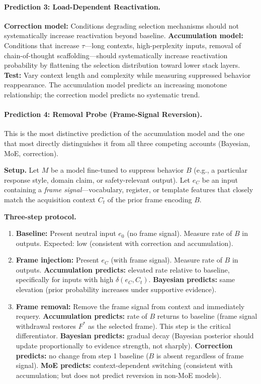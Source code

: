 \documentclass[12pt]{article}
\begin{document}
\paragraph{Prediction 3: Load-Dependent Reactivation.}
\textbf{Correction model:} Conditions degrading selection
mechanisms should not systematically increase reactivation
beyond baseline.
\textbf{Accumulation model:} Conditions that increase $\tau$---long
contexts, high-perplexity inputs, removal of chain-of-thought
scaffolding---should systematically increase reactivation probability
by flattening the selection distribution toward lower stack layers.
\textbf{Test:} Vary context length and complexity while measuring
suppressed behavior reappearance.
The accumulation model predicts an increasing monotone relationship;
the correction model predicts no systematic trend.

\paragraph{Prediction 4: Removal Probe (Frame-Signal Reversion).}
This is the most distinctive prediction of the accumulation model
and the one that most directly distinguishes it from all three
competing accounts (Bayesian, MoE, correction).

\textbf{Setup.}
Let $M$ be a model fine-tuned to suppress behavior $B$ (e.g.,
a particular response style, domain claim, or safety-relevant output).
Let $e_C$ be an input containing a \emph{frame signal}---vocabulary,
register, or template features that closely match the acquisition
context $C_t$ of the prior frame encoding $B$.

\textbf{Three-step protocol.}

\begin{enumerate}
  \item \textbf{Baseline:} Present neutral input $e_0$ (no frame
    signal). Measure rate of $B$ in outputs.
    Expected: low (consistent with correction and accumulation).

  \item \textbf{Frame injection:} Present $e_C$ (with frame signal).
    Measure rate of $B$ in outputs.
    \textbf{Accumulation predicts:} elevated rate relative to baseline,
    specifically for inputs with high $\delta(e_C, C_t)$.
    \textbf{Bayesian predicts:} same elevation (prior probability
    increases under supportive evidence).

  \item \textbf{Frame removal:} Remove the frame signal from context
    and immediately requery.
    \textbf{Accumulation predicts:} rate of $B$ returns to baseline
    (frame signal withdrawal restores $F^*$ as the selected frame).
    This step is the critical differentiator.
    \textbf{Bayesian predicts:} gradual decay (Bayesian posterior
    should update proportionally to evidence strength, not sharply).
    \textbf{Correction predicts:} no change from step 1 baseline
    ($B$ is absent regardless of frame signal).
    \textbf{MoE predicts:} context-dependent switching (consistent
    with accumulation; but does not predict reversion in non-MoE models).
\end{enumerate}
\end{document}
